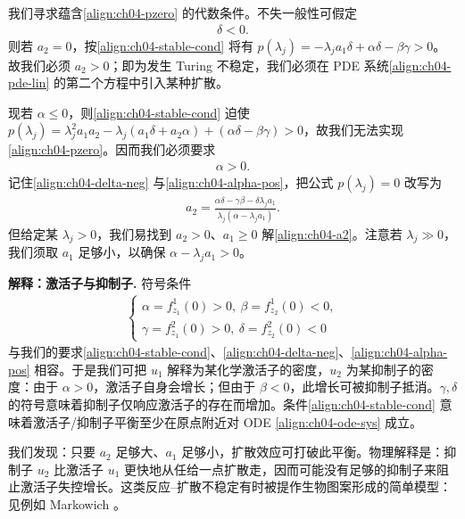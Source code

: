 \documentclass[../../main.tex]{subfiles}
\begin{document}
我们寻求蕴含\eqref{align:ch04-pzero} 的代数条件。不失一般性可假定
\begin{align}\label{align:ch04-delta-neg}
\delta<0.
\end{align}
则若 $a_2=0$，按\eqref{align:ch04-stable-cond} 将有 $p(\lambda_j)=-\lambda_j a_1\delta+\alpha\delta-\beta\gamma>0$。故我们必须 $a_2>0$；即为发生 Turing 不稳定，我们必须在 PDE 系统\eqref{align:ch04-pde-lin} 的第二个方程中引入某种扩散。

现若 $\alpha\leqslant 0$，则\eqref{align:ch04-stable-cond} 迫使 $p(\lambda_j)=\lambda_j^2 a_1a_2-\lambda_j(a_1\delta+a_2\alpha)+(\alpha\delta-\beta\gamma)>0$，故我们无法实现\eqref{align:ch04-pzero}。因而我们必须要求
\begin{align}\label{align:ch04-alpha-pos}
\alpha>0.
\end{align}
记住\eqref{align:ch04-delta-neg} 与\eqref{align:ch04-alpha-pos}，把公式 $p(\lambda_j)=0$ 改写为
\begin{align}\label{align:ch04-a2}
a_2=\frac{\alpha\delta-\gamma\beta-\delta\lambda_j a_1}{\lambda_j(\alpha-\lambda_j a_1)}.
\end{align}
但给定某 $\lambda_j>0$，我们易找到 $a_2>0$、$a_1\geqslant 0$ 解\eqref{align:ch04-a2}。注意若 $\lambda_j\gg 0$，我们须取 $a_1$ 足够小，以确保 $\alpha-\lambda_j a_1>0$。

\textbf{解释：激活子与抑制子.} 符号条件
\begin{align*}
\begin{cases}
\alpha=f^1_{z_1}(0)>0,\ \beta=f^1_{z_2}(0)<0,\\
\gamma=f^2_{z_1}(0)>0,\ \delta=f^2_{z_2}(0)<0
\end{cases}
\end{align*}
与我们的要求\eqref{align:ch04-stable-cond}、\eqref{align:ch04-delta-neg}、\eqref{align:ch04-alpha-pos} 相容。于是我们可把 $u_1$ 解释为某化学激活子的密度，$u_2$ 为某抑制子的密度：由于 $\alpha>0$，激活子自身会增长；但由于 $\beta<0$，此增长可被抑制子抵消。$\gamma,\delta$ 的符号意味着抑制子仅响应激活子的存在而增加。条件\eqref{align:ch04-stable-cond} 意味着激活子/抑制子平衡至少在原点附近对 ODE \eqref{align:ch04-ode-sys} 成立。

我们发现：只要 $a_2$ 足够大、$a_1$ 足够小，扩散效应可打破此平衡。物理解释是：抑制子 $u_2$ 比激活子 $u_1$ 更快地从任给一点扩散走，因而可能没有足够的抑制子来阻止激活子失控增长。这类反应--扩散不稳定有时被提作生物图案形成的简单模型：见例如 Markowich \cite{Mr}。
\end{document}
